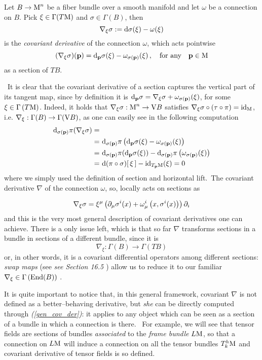 \begin{defi}
    Let $B\to\text{\normalfont M}^n$ be a fiber bundle over a smooth manifold and let $\omega$ be a connection on $B$. Pick $\xi\in\Gamma(T\text{\normalfont M})$ and $\sigma\in\Gamma(B)$, then
    $$\nabla_\xi\sigma:=\text{\normalfont d}\sigma(\xi)-\omega(\xi)$$
    is the \emph{covariant derivative} of the connection $\omega$, which acts pointwise
    $$(\nabla_\xi\sigma)(\mathbf{p})=\text{\normalfont d}_{\mathbf{p}}\sigma(\xi)-\omega_{\sigma(\mathbf{p})}(\xi)\,,\quad\text{for any}\quad\mathbf{p}\in\text{\normalfont M}$$
    as a section of $TB$.
\end{defi}
\,\newline
It is clear that the covariant derivative of a section captures the vertical part of its tangent map, since by definition it is
$\text{\normalfont d}_{\mathbf{p}}\sigma=\nabla_\xi\sigma+\omega_{\sigma(\mathbf{p})}(\xi)$, for some $\xi\in\Gamma\left(T\text{\normalfont M}\right)$.
Indeed, it holds that $\nabla_\xi\sigma:\text{\normalfont M}^n\to\text{\normalfont V} B$ satisfies $\nabla_\xi\sigma\circ(\tau\circ\pi)=\text{\normalfont id}_{\text{\normalfont M}}$, i.e. $\nabla_\xi:\Gamma(B)\to\Gamma(\text{\normalfont V} B)$, as one can easily see in the following computation
\begin{align*}
    \text{\normalfont d}_{\sigma(\mathbf{p})}\pi(\nabla_\xi\sigma)=&\\
    =&\,\,\text{\normalfont d}_{\sigma(\mathbf{p})}\pi\left(\text{\normalfont d}_{\mathbf{p}}\sigma(\xi)-\omega_{\sigma(\mathbf{p})}(\xi)\right)\\
    =&\,\,\text{\normalfont d}_{\sigma(\mathbf{p})}\pi(\text{\normalfont d}_{\mathbf{p}}\sigma(\xi))-\text{\normalfont d}_{\sigma(\mathbf{p})}\pi\left(\omega_{\sigma(\mathbf{p})}(\xi)\right)\\
    =&\,\,\text{\normalfont d}(\pi\circ\sigma)[\,\xi\,]-\text{\normalfont id}_{T_{\mathbf{p}}\text{\normalfont M}}(\xi)=0
\end{align*}
where we simply used the definition of section and horizontal lift.\, The covariant derivative $\nabla$ of the connection $\omega$, so, locally acts on sections as

\begin{equation}\label{gen_cov_der}
    \nabla_\xi\sigma=\xi^\mu\left(\partial_\mu\sigma^i(x)+\omega^i_\mu\left(x,\sigma^i(x)\right)\right)\partial_i
\end{equation}
and this is the very most general description of covariant derivatives one can achieve. There is a only issue left, which is that so far $\nabla$ transforms sections in a bundle in sections of a different bundle, since it is
$$\nabla_\xi:\Gamma(B)\to\Gamma(TB)$$
or, in other words, it is a covariant differential operators among different sections: \emph{swap maps} (see \emph{see \emph{Section 16.5 \cite{fatib}}}) allow us to reduce it to our familiar $\nabla_\xi\in\Gamma\left(\text{\normalfont End}(B)\right)$ .

\begin{remark}
    It is quite important to notice that, in this general framework, covariant $\nabla$ is not defined as a better--behaving derivative, but \emph{she} can be directly computed through \emph{(\ref{gen_cov_der})}: it applies to any object which can be seen as a section of a bundle in which a connection is there. \, For example, we will see that tensor fields are sections of bundles \emph{associated} to the \emph{frame bundle} $L\text{\normalfont M}$, so that a connection on $L\text{\normalfont M}$ will induce a connection on all the tensor bundles $T^h_k\text{\normalfont M}$ and covariant derivative of tensor fields is so defined. 
\end{remark}

